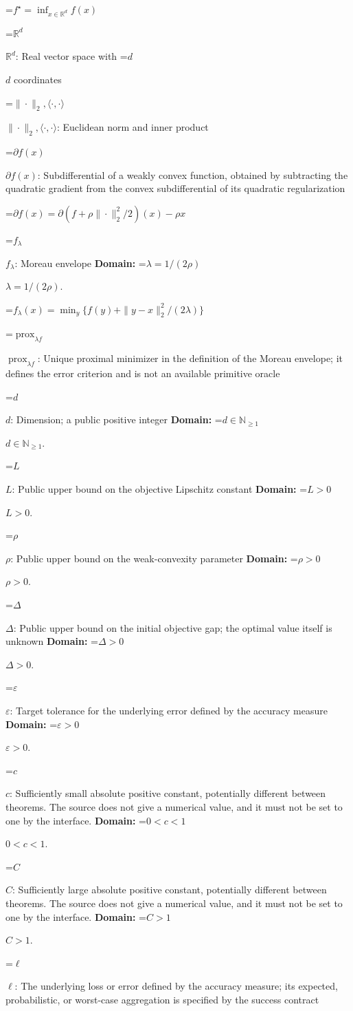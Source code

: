\documentclass[10pt,a4paper]{article}
\newcommand{\AtlasMath}[1]{\par\begingroup\centering\setbox0=\hbox{$\displaystyle #1$}\ifdim\wd0>1.4\linewidth\typeout{ATLAS WIDE FORMULA: \the\wd0}\fi\ifdim\wd0>\linewidth\resizebox{\linewidth}{!}{\box0}\else\box0\fi\par\endgroup}
\newcommand{\AtlasInlineMath}[1]{\begingroup\setbox0=\hbox{$#1$}\ifdim\wd0>.4\linewidth\endgroup\AtlasMath{#1}\else\endgroup$#1$\fi}
\begin{document}
\AtlasMath{f^\star=\inf_{x\in \mathbb{R}^d}f(x)}


\AtlasInlineMath{\mathbb{R}^d}: Real vector space with \AtlasInlineMath{d} coordinates

\AtlasInlineMath{\|\cdot\|_2,\langle\cdot,\cdot\rangle}: Euclidean norm and inner product

\AtlasInlineMath{\partial f(x)}: Subdifferential of a weakly convex function, obtained by subtracting the quadratic gradient from the convex subdifferential of its quadratic regularization


\AtlasMath{\partial f(x)=\partial(f+\rho\|\cdot\|_2^2/2)(x)-\rho x}


\AtlasInlineMath{f_\lambda}: Moreau envelope \textbf{Domain:} \AtlasInlineMath{\lambda=1/(2\rho)}.


\AtlasMath{f_\lambda(x)=\min_y\{f(y)+\|y-x\|_2^2/(2\lambda)\}}


\AtlasInlineMath{\operatorname{prox}_{\lambda f}}: Unique proximal minimizer in the definition of the Moreau envelope; it defines the error criterion and is not an available primitive oracle

\AtlasInlineMath{d}: Dimension; a public positive integer \textbf{Domain:} \AtlasInlineMath{d\in\mathbb{N}_{\ge1}}.

\AtlasInlineMath{L}: Public upper bound on the objective Lipschitz constant \textbf{Domain:} \AtlasInlineMath{L>0}.

\AtlasInlineMath{\rho}: Public upper bound on the weak-convexity parameter \textbf{Domain:} \AtlasInlineMath{\rho>0}.

\AtlasInlineMath{\Delta}: Public upper bound on the initial objective gap; the optimal value itself is unknown \textbf{Domain:} \AtlasInlineMath{\Delta>0}.

\AtlasInlineMath{\varepsilon}: Target tolerance for the underlying error defined by the accuracy measure \textbf{Domain:} \AtlasInlineMath{\varepsilon>0}.

\AtlasInlineMath{c}: Sufficiently small absolute positive constant, potentially different between theorems. The source does not give a numerical value, and it must not be set to one by the interface. \textbf{Domain:} \AtlasInlineMath{0<c<1}.

\AtlasInlineMath{C}: Sufficiently large absolute positive constant, potentially different between theorems. The source does not give a numerical value, and it must not be set to one by the interface. \textbf{Domain:} \AtlasInlineMath{C>1}.

\AtlasInlineMath{\ell}: The underlying loss or error defined by the accuracy measure; its expected, probabilistic, or worst-case aggregation is specified by the success contract
\end{document}
